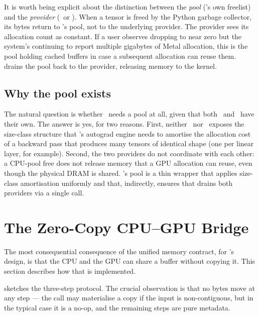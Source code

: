 It is worth being explicit about the distinction between the
\emph{pool} (\Lucid's own freelist) and the \emph{provider}
(\MLX\ or \Accelerate). When a tensor is freed by the Python garbage
collector, its bytes return to \Lucid's pool, not to the underlying
provider. The provider sees its allocation count as constant. If a
user observes  dropping to
near zero but the system's  continuing to
report multiple gigabytes of Metal allocation, this is the pool
holding cached buffers in case a subsequent allocation can reuse
them.  drains the pool back to the
provider, releasing memory to the kernel.

\subsection{Why the pool exists}
\label{ssec:unified_memory:pool_rationale}

The natural question is whether \Lucid\ needs a pool at all, given
that both \MLX\ and \Accelerate\ have their own. The answer is yes,
for two reasons. First, neither \MLX\ nor \Accelerate\ exposes the
size-class structure that \Lucid's autograd engine needs to amortise
the allocation cost of a backward pass that produces many tensors
of identical shape (one per linear layer, for example). Second, the
two providers do not coordinate with each other: a CPU-pool free
does not release memory that a GPU allocation can reuse, even though
the physical DRAM is shared. \Lucid's pool is a thin wrapper that
applies size-class amortisation uniformly and that, indirectly,
ensures that  drains both providers via a
single call.

\section{The Zero-Copy CPU--GPU Bridge}
\label{sec:unified_memory:bridge}

The most consequential consequence of the unified memory contract,
for \Lucid's design, is that the CPU and the GPU can share a buffer
without copying it. This section describes how that is implemented.

 sketches the three-step protocol.
The crucial observation is that no bytes move at any step --- the
 call may materialise a copy if the input is
non-contiguous, but in the typical case it is a no-op, and the
remaining steps are pure metadata.

